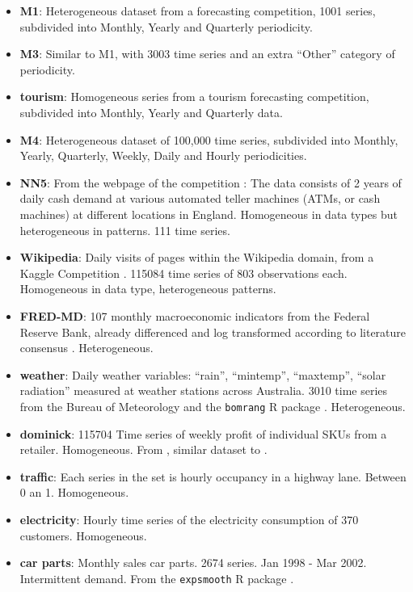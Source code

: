 \documentclass[a4paper]{article}
\theoremstyle{custom}
\begin{document}
\begin{itemize}
\item \textbf{M1}: Heterogeneous dataset from a forecasting competition, 1001 series, subdivided into Monthly, Yearly and Quarterly periodicity.
\item \textbf{M3}: Similar to M1, with 3003 time series and an extra ``Other'' category of periodicity.
\item \textbf{tourism}: Homogeneous series from a tourism forecasting competition, subdivided into Monthly, Yearly and Quarterly data.
\item \textbf{M4}: Heterogeneous dataset of 100,000 time series, subdivided into Monthly, Yearly, Quarterly, Weekly, Daily and Hourly periodicities.
\item \textbf{NN5}: From the webpage of the competition \cite{nn5url}: The data consists of 2 years of daily cash demand at various automated teller machines (ATMs, or cash machines) at different locations in England. Homogeneous in data types but heterogeneous in patterns. 111 time series.
\item \textbf{Wikipedia}: Daily visits of pages within the Wikipedia domain, from a Kaggle Competition \cite{wikikaggle}. 115084 time series of 803 observations each. Homogeneous in data type, heterogeneous patterns.
\item \textbf{FRED-MD}: 107 monthly macroeconomic indicators from the Federal Reserve Bank, already differenced and log transformed according to literature consensus \cite{mccraken2018fredmd}. Heterogeneous.
\item \textbf{weather}: Daily weather variables: ``rain'', ``mintemp'', ``maxtemp'', ``solar radiation'' measured at weather stations across Australia. 3010 time series from the Bureau of Meteorology and the \texttt{bomrang} R package \cite{Rbomrang}. Heterogeneous.
\item \textbf{dominick}: 115704 Time series of weekly profit of individual SKUs from a retailer. Homogeneous. From \cite{dominicks}, similar dataset to \cite{gasthaus2019probabilistic}.
\item \textbf{traffic}: Each series in the set is hourly occupancy in a highway lane. Between 0 an 1. Homogeneous.
\item \textbf{electricity}: Hourly time series of the electricity consumption of 370 customers. Homogeneous.
\item \textbf{car parts}: Monthly sales car parts. 2674 series. Jan 1998 - Mar 2002. Intermittent demand. From the \texttt{expsmooth} R package \cite{Rexpsmooth}.

\end{itemize}
\end{document}

